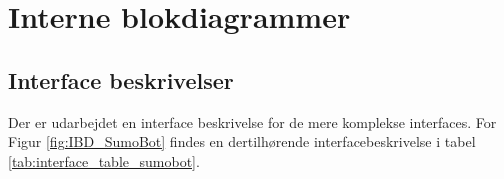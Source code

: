 \section{Interne blokdiagrammer}
\subsection{Interface beskrivelser}
\noindent Der er udarbejdet en interface beskrivelse for de mere komplekse interfaces. For Figur \ref{fig:IBD_SumoBot} findes en dertilhørende interfacebeskrivelse i tabel \ref{tab:interface_table_sumobot}.




